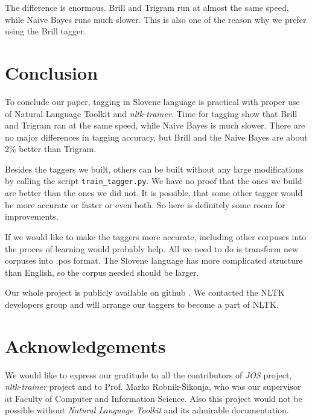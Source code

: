 \documentclass[10pt, conference, compsocconf]{IEEEtran}
\begin{document}
The difference is enormous. Brill and Trigram run at almost the same speed, while Naive Bayes runs much slower. This is also one of the reason why we prefer using the Brill tagger. 

\section{Conclusion} %
To conclude our paper, tagging in Slovene language is practical with proper use of Natural Language Toolkit and \textit{nltk-trainer}. Time for tagging show that Brill and Trigram ran at the same speed, while Naive Bayes is much slower. There are no major differences in tagging accuracy, but Brill and the Naive Bayes are about 2\% better than Trigram.
\par
Besides the taggers we built, others can be built without any large modifications by calling the script \texttt{train\_tagger.py}. We have no proof that the ones we build are better than the ones we did not. It is possible, that some other tagger would be more accurate or faster or even both. So here is definitely some room for improvements.
\par
If we would like to make the taggers more accurate, including other corpuses into the proces of learning would probably help. All we need to do is transform new corpuses into .pos format. The Slovene language has more complicated structure than English, so the corpus needed should be larger.
\par
Our whole project is publicly available on github \cite{CODE}. We contacted the NLTK developers group and will arrange our taggers to become a part of NLTK.

\section*{Acknowledgements} %
We would like to express our gratitude to all the contributors of \textit{JOS} \cite{JOS} project, \textit{nltk-trainer} \cite{nltk-trainer} project and to Prof. Marko Robnik-Šikonja, who was our supervisor at Faculty of Computer and Information Science. Also this project would not be possible without \textit{Natural Language Toolkit} \cite{nltk} and its admirable documentation.
\end{document}
